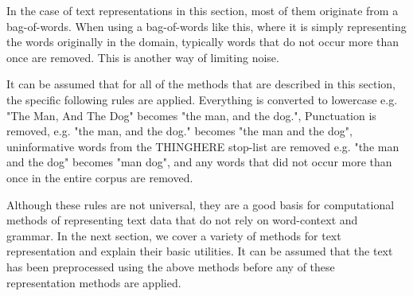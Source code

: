 In the case of  text representations in this section, most of them originate from a bag-of-words. When using a bag-of-words like this, where it is simply representing the words originally in the domain, typically words that do not occur more than once are removed. This is another way of limiting noise. %





It can be assumed that for all of the methods that are described in this section, the specific following rules are applied. Everything is converted to lowercase e.g. "The Man, And The Dog" becomes  "the man, and the dog.", Punctuation is removed, e.g. "the man, and the dog." becomes "the man and the dog", uninformative words from the THINGHERE stop-list are removed e.g. "the man and the dog" becomes "man dog", and any words that did not occur more than once in the entire corpus are removed. %


Although these rules are not universal, they are a good basis for computational methods of representing text data that do not rely on word-context and grammar. In the next section, we cover a variety of methods for text representation and explain their basic utilities. It can be assumed that the text has been preprocessed using the above methods before any of these representation methods are applied.

